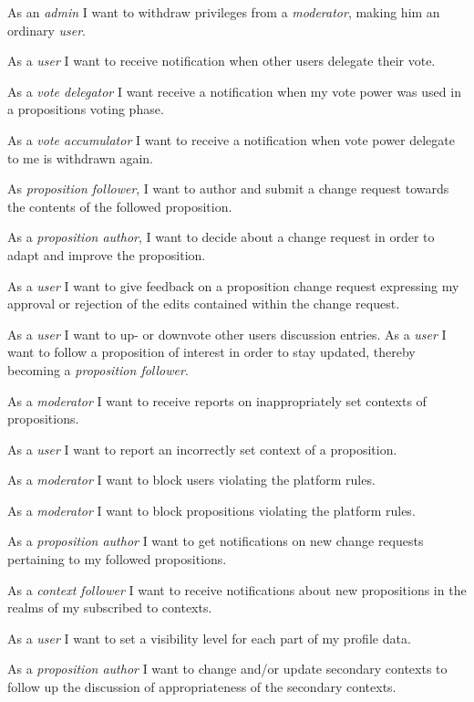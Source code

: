  As an \textit{admin} I want to withdraw privileges from a \textit{moderator}, making him an ordinary \textit{user}.

 As a \textit{user} I want to receive notification when other users delegate their vote.

 As a \textit{vote delegator} I want receive a notification when my vote power was used in a propositions voting phase.

 As a \textit{vote accumulator} I want to receive a notification when vote power delegate to me is withdrawn again.

 As \textit{proposition follower}, I want to author and submit a change request towards the contents of the followed proposition.

 As a \textit{proposition author}, I want to decide about a change request in order to adapt and improve the proposition.

 As a \textit{user} I want to give feedback on a proposition change request expressing my approval or rejection of the edits contained within the change request.

 As a \textit{user} I want to up- or downvote other users discussion entries.
 As a \textit{user} I want to follow a proposition of interest in order to stay updated, thereby becoming a \textit{proposition follower}.

 As a \textit{moderator} I want to receive reports on inappropriately set contexts of propositions.

 As a \textit{user} I want to report an incorrectly set context of a proposition.

 As a \textit{moderator} I want to block users violating the platform rules.

 As a \textit{moderator} I want to block propositions violating the platform rules.

 As a \textit{proposition author} I want to get notifications on new change requests pertaining to my followed propositions.

 As a \textit{context follower} I want to receive notifications about new propositions in the realms of my subscribed to contexts.

 As a \textit{user} I want to set a visibility level for each part of my profile data.

 As a \textit{proposition author} I want to change and/or update secondary contexts to follow up the discussion of appropriateness of the secondary contexts.

